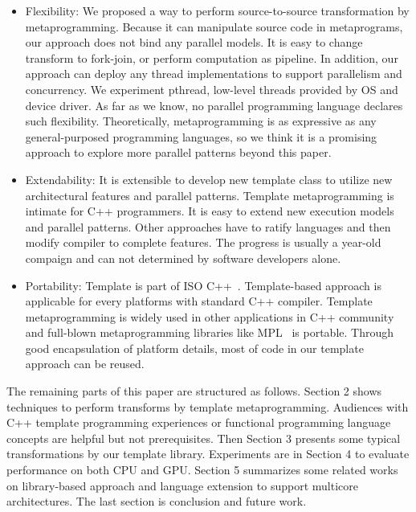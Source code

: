 \begin{itemize}
\item Flexibility: We proposed a way to perform source-to-source transformation by
metaprogramming. Because it can manipulate source code in metaprograms,  our approach does not bind any parallel models. It is easy to
change transform to fork-join, or perform computation
as pipeline. In addition, our approach can deploy any thread
implementations to support parallelism and concurrency. We experiment
pthread, low-level threads provided by OS and device driver. As far as we know, no parallel programming language
declares such flexibility. Theoretically, metaprogramming is
as expressive as any general-purposed programming languages, so we
think it is a promising approach to explore more parallel patterns
beyond this paper.

\item Extendability:  It is extensible to develop new template class to
  utilize new architectural features  and parallel patterns. Template
  metaprogramming is intimate for C++ programmers. It is easy to
  extend new execution models and parallel patterns. Other approaches
  have to ratify languages and then modify compiler to complete
  features. The progress is usually a year-old compaign and can not
  determined by software developers alone.

\item Portability: Template is part of ISO C++~\cite{c++03, c++0x}. Template-based approach is applicable for every
  platforms with standard C++ compiler. Template metaprogramming is
  widely used in other applications in C++ community and full-blown
  metaprogramming libraries like
  MPL~\cite{mpl} is portable. Through good encapsulation of
  platform details, most of code in our template approach can be reused.
\end{itemize}

The remaining parts of this paper are structured as follows.
 Section 2 shows techniques to perform
transforms by template metaprogramming. Audiences with C++ template
programming experiences or functional programming language concepts
are helpful but not prerequisites. Then Section 3 presents some
typical transformations by our template library. Experiments are in
Section 4 to evaluate performance on both CPU and GPU.
Section 5 summarizes some related works on library-based approach and
language extension to support multicore architectures.  The last section is conclusion and future work.

